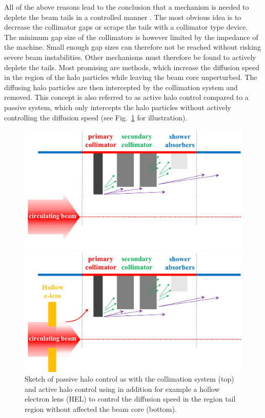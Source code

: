 \documentclass[%
 reprint,
 amsmath,amssymb,
 aps,
prstab,
]{revtex4-1}
\begin{document}
All of the above reasons lead to the conclusion that a mechanism is needed to deplete the beam tails in a controlled manner \cite{helreview}. The most obvious idea is to decrease the collimator gaps or scrape the tails with a collimator type device. The minimum gap size of the collimators is however limited by the impedance of the machine. Small enough gap sizes can therefore not be reached without risking severe beam instabilities. Other mechanisms must therefore be found to actively deplete the tails. Most promising are methods, which increase the diffusion speed in the region of the halo particles while leaving the beam core unperturbed. The diffusing halo particles are then intercepted by the collimation system and removed. This concept is also referred to as active halo control compared to a passive system, which only intercepts the halo particles without actively controlling the diffusion speed (see Fig.~\ref{fig:active_halo_control} for illustration).
\begin{figure}[h]
	\begin{minipage}[t]{1.0\linewidth}
		\centering
		\includegraphics[width=0.7\linewidth]{passive_halo_control.png}
	\end{minipage}
	\begin{minipage}[t]{1.0\linewidth}
		\centering
		\includegraphics[width=0.7\linewidth]{active_halo_control.png}
	\end{minipage}	
	\caption{\label{fig:active_halo_control} Sketch of passive halo control as with the collimation system (top) and active halo control using in addition for example a hollow electron lens (HEL) to control the diffusion speed in the region tail region without affected the beam core (bottom).}
\end{figure}
\end{document}
